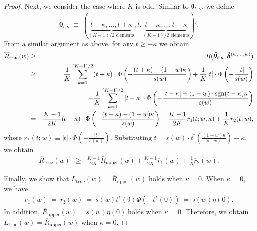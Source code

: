 \documentclass[12pt,a4paper]{article}
\begin{document}
\begin{proof}
Next, we consider the case where $K$ is odd. Similar to $\bm{\theta}_{t,\kappa}$, we define 
$$
\tilde{\bm{\theta}}_{t,\kappa} \ \equiv \ (\underbrace{t+\kappa, \ldots, t+\kappa}_{\text{$(K-1)/2$ elements}}, t, \underbrace{t-\kappa, \ldots, t-\kappa}_{\text{$(K-1)/2$ elements}})'.
$$
From a similar argument as above, for any $t \geq - \kappa$ we obtain
\begin{eqnarray*}
\overline{R}_{\mathrm{true}}(w) & \geq & R(\tilde{\bm{\theta}}_{t,\kappa},\hat{\bm{\delta}}^{(w,\ldots, w)}) \\
& \geq & \frac{1}{K} \sum_{k=1}^{(K-1)/2} (t+\kappa) \cdot \Phi \left( - \frac{(t+\kappa) - (1-w) \kappa}{s(w)} \right) + \frac{1}{K} |t| \cdot \Phi \left( - \frac{|t|}{s(w)} \right)  \nonumber \\
& &  \hspace{0.3in} + \frac{1}{K} \sum_{k=1}^{(K-1)/2} |t-\kappa| \cdot \Phi \left( - \frac{|t-\kappa| + (1-w) \cdot \mathrm{sgn}(t-\kappa)  \kappa}{s(w)} \right) \nonumber \\
&=& \frac{K-1}{2K} (t+\kappa) \cdot \Phi \left( - \frac{(t+\kappa) - (1-w) \kappa}{s(w)} \right) + \frac{K-1}{2K} r_1(t;w,\kappa) + \frac{1}{K} r_2(t;w),
\end{eqnarray*}
where $r_2(t;w) \equiv |t| \cdot \Phi \left( - \frac{|t|}{s(w)} \right)$. Substituting $t = s(w) \cdot t^{\ast}\left( \frac{(1-w)\kappa}{s(w)} \right) - \kappa$, we obtain
\begin{eqnarray*}
\overline{R}_{\mathrm{true}}(w) & \geq & \frac{K-1}{2K} \overline{R}_{\mathrm{upper}}(w) + \frac{K-1}{2K} \overline{r}_1(w) + \frac{1}{K} \overline{r}_2(w).
\end{eqnarray*}

Finally, we show that $L_{\mathrm{true}}(w) = \overline{R}_{\mathrm{upper}}(w)$ holds when $\kappa=0$. When $\kappa=0$, we have
\begin{eqnarray*}
\overline{r}_1(w) \ = \ \overline{r}_2(w) \ = \ s(w) t^{\ast}(0) \Phi \left( -t^{\ast}(0) \right) \ = \ s(w) \eta(0).
\end{eqnarray*}
In addition, $\overline{R}_{\mathrm{upper}}(w) = s(w) \eta(0)$ holds when $\kappa=0$. Therefore, we obtain $L_{\mathrm{true}}(w) = \overline{R}_{\mathrm{upper}}(w)$ when $\kappa=0$.
\end{proof}\vspace{0.1in}
\end{document}

